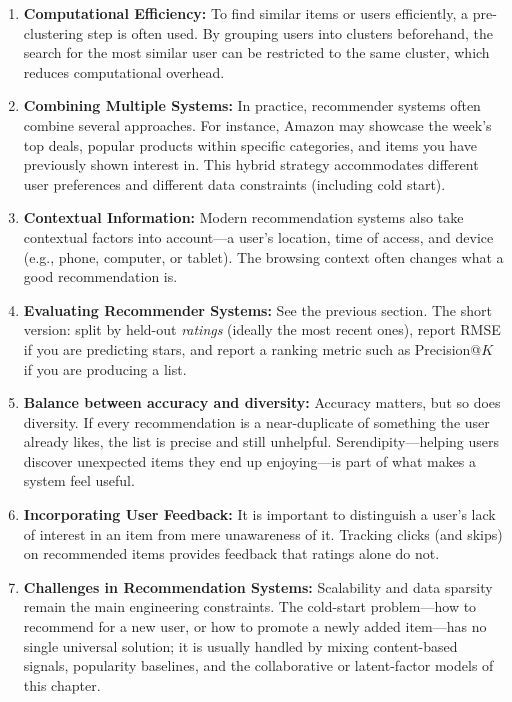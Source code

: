 \documentclass[
]{book}
\begin{document}
\begin{enumerate}
\def\labelenumi{\arabic{enumi}.}
\item
  \textbf{Computational Efficiency:}
  To find similar items or users efficiently, a pre-clustering step is often used. By grouping users into clusters beforehand, the search for the most similar user can be restricted to the same cluster, which reduces computational overhead.
\item
  \textbf{Combining Multiple Systems:}
  In practice, recommender systems often combine several approaches. For instance, Amazon may showcase the week's top deals, popular products within specific categories, and items you have previously shown interest in. This hybrid strategy accommodates different user preferences and different data constraints (including cold start).
\item
  \textbf{Contextual Information:}
  Modern recommendation systems also take contextual factors into account---a user's location, time of access, and device (e.g., phone, computer, or tablet). The browsing context often changes what a good recommendation is.
\item
  \textbf{Evaluating Recommender Systems:}
  See the previous section. The short version: split by held-out \emph{ratings} (ideally the most recent ones), report RMSE if you are predicting stars, and report a ranking metric such as Precision@\(K\) if you are producing a list.
\item
  \textbf{Balance between accuracy and diversity:}
  Accuracy matters, but so does diversity. If every recommendation is a near-duplicate of something the user already likes, the list is precise and still unhelpful. Serendipity---helping users discover unexpected items they end up enjoying---is part of what makes a system feel useful.
\item
  \textbf{Incorporating User Feedback:}
  It is important to distinguish a user's lack of interest in an item from mere unawareness of it. Tracking clicks (and skips) on recommended items provides feedback that ratings alone do not.
\item
  \textbf{Challenges in Recommendation Systems:}
  Scalability and data sparsity remain the main engineering constraints. The cold-start problem---how to recommend for a new user, or how to promote a newly added item---has no single universal solution; it is usually handled by mixing content-based signals, popularity baselines, and the collaborative or latent-factor models of this chapter.
\end{enumerate}
\end{document}
